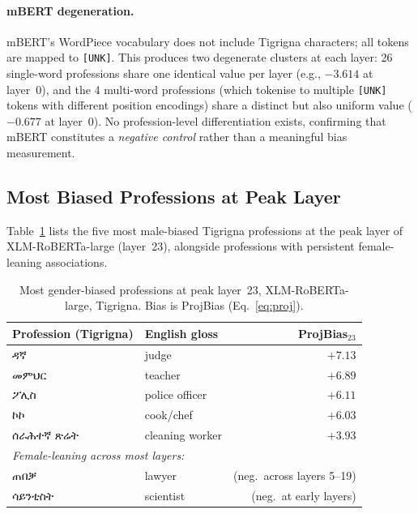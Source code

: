 \documentclass[10pt]{article}
\begin{document}
\paragraph{mBERT degeneration.}
mBERT's WordPiece vocabulary does not include Tigrigna characters; all tokens
are mapped to \texttt{[UNK]}. This produces two degenerate clusters at each
layer: 26 single-word professions share one identical value per layer (e.g.,
$-3.614$ at layer~0), and the 4 multi-word professions (which tokenise to
multiple \texttt{[UNK]} tokens with different position encodings) share a
distinct but also uniform value ($-0.677$ at layer~0). No profession-level
differentiation exists, confirming that mBERT constitutes a \emph{negative
control} rather than a meaningful bias measurement.

\subsection{Most Biased Professions at Peak Layer}
\label{sec:professions}

Table~\ref{tab:top5-xlmrlarge} lists the five most male-biased Tigrigna
professions at the peak layer of XLM-RoBERTa-large (layer~23), alongside
professions with persistent female-leaning associations.

\begin{table}[H]
\centering
\caption{Most gender-biased professions at peak layer~23,
         XLM-RoBERTa-large, Tigrigna. Bias is ProjBias (Eq.~\ref{eq:proj}).}
\label{tab:top5-xlmrlarge}
\small
\begin{tabular}{llr}
\toprule
\textbf{Profession (Tigrigna)} & \textbf{English gloss} & \textbf{ProjBias$_{23}$} \\
\midrule
ዳኛ                    & judge           & $+7.13$ \\
መምህር                 & teacher         & $+6.89$ \\
ፖሊስ                  & police officer  & $+6.11$ \\
ኮኮ                   & cook/chef       & $+6.03$ \\
ሰራሕተኛ ጽሬት           & cleaning worker & $+3.93$ \\
\midrule
\multicolumn{3}{l}{\textit{Female-leaning across most layers:}} \\
ጠበቓ                  & lawyer          & (neg.\ across layers 5--19) \\
ሳይንቲስት               & scientist       & (neg.\ at early layers) \\
\bottomrule
\end{tabular}
\end{table}
\end{document}
